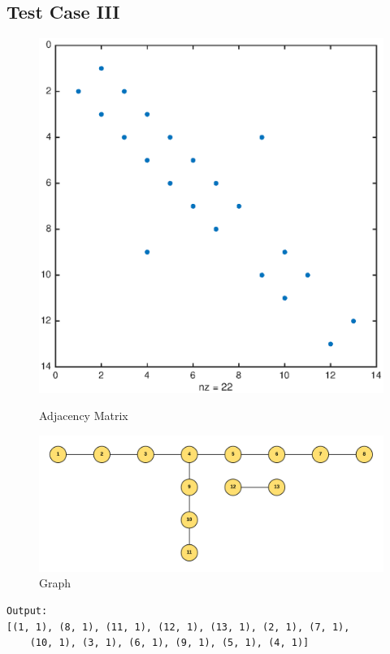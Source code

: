 \subsection{Test Case III}
\begin{figure}[H]
  \includegraphics[width=\linewidth]{spy3.eps}
  \caption{Adjacency Matrix}
\endminipage\hfill
{}
  \includegraphics[width=\linewidth]{graph3}
  \caption{Graph}
\endminipage
\end{figure}

\begin{verbatim}
Output:
[(1, 1), (8, 1), (11, 1), (12, 1), (13, 1), (2, 1), (7, 1), 
	(10, 1), (3, 1), (6, 1), (9, 1), (5, 1), (4, 1)]
\end{verbatim}

